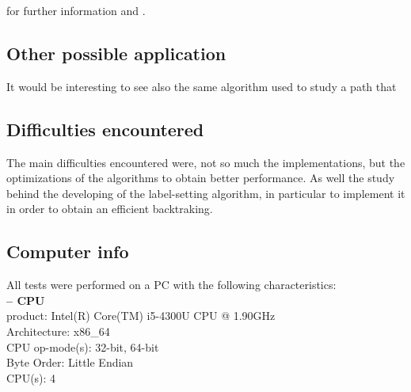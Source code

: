 \documentclass[a4paper,11pt]{report}
\begin{document}
for further information \cite{GAWikipedia} and \cite{GAArticle}. 

\subsection{Other possible application}
It would be interesting to see also the same algorithm used to study a path that 


\subsection{Difficulties encountered}
The main difficulties encountered were, not so much the implementations, but the optimizations of the algorithms to obtain better performance. As well the study behind the developing of the label-setting algorithm, in particular to implement it in order to obtain an efficient backtraking. 

\subsection*{Computer info}
All tests were performed on a PC with the following characteristics:\\
\textbf{-- CPU\\}
product:\hspace{17mm}        Intel(R) Core(TM) i5-4300U CPU @ 1.90GHz\\
Architecture:\hspace{9mm}   x86\_64\\
CPU op-mode(s):\hspace{2mm}  32-bit, 64-bit\\
Byte Order:\hspace{11mm}     Little Endian\\
CPU(s):\hspace{18mm}         4\\





\end{document}
